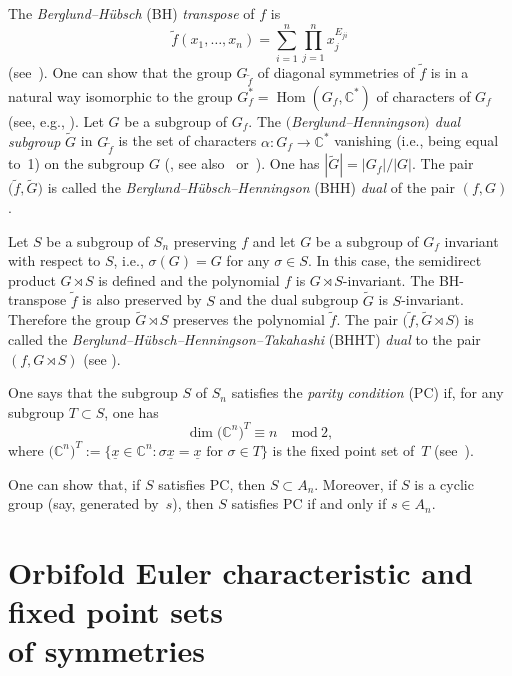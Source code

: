 The {\em Berglund--H\"ubsch} (BH) {\em transpose} of $f$ is
\[
\widetilde{f}(x_1, \dots, x_n)=\sum_{i=1}^n \prod_{j=1}^n x_j^{E_{ji}}
\]
(see~\cite{BH1}). One can show that the group $G_{\widetilde{f}}$ of diagonal symmetries of $\widetilde{f}$ is in a natural way isomorphic
to the group $G_f^*=\operatorname{Hom}(G_f,{\mathbb C}^*)$ of characters of $G_f$ (see, e.g., \cite[Proposition~2]{EG-BLMS}). Let $G$ be a subgroup of $G_f$. The {\em $($Berglund--Henningson$)$ dual subgroup} $\widetilde{G}$ in $G_{\widetilde{f}}$ is the set of characters $\alpha\colon G_f \to {\mathbb C}^*$ vanishing (i.e., being equal to~1) on the subgroup $G$ (\cite{BH2}, see also~\cite{Krawitz-thesis} or~\cite{Krawitz}). One has $|\widetilde{G}|=|G_f|/|G|$. The pair $\big(\widetilde{f},\widetilde{G}\big)$ is called the {\em Berglund--H\"ubsch--Henningson} (BHH) {\em dual}
of the pair $(f,G)$.

Let $S$ be a subgroup of $S_n$ preserving $f$ and let $G$ be a subgroup of $G_f$ invariant with respect to $S$, i.e., $\sigma(G)=G$ for any $\sigma \in S$. In this case, the semidirect product $G \rtimes S$ is defined and the polynomial $f$ is $G \rtimes S$-invariant. The BH-transpose $\widetilde{f}$ is also preserved by $S$ and the dual subgroup $\widetilde{G}$ is $S$-invariant. Therefore the group $\widetilde{G} \rtimes S$ preserves the polynomial $\widetilde{f}$. The pair $\big(\widetilde{f},\widetilde{G}\rtimes S\big)$ is called the {\em Berglund--H\"ubsch--Henningson--Takahashi} (BHHT) {\em dual} to the pair $(f,G\rtimes S)$ (see \cite{EG-IMRN}).

One says that the subgroup $S$ of $S_n$ satisfies the {\em parity condition} (PC) if, for any subgroup
$T \subset S$, one has
\[
\dim\big({\mathbb C}^n\big)^T \equiv n \quad \mbox{mod}\ 2,
\]
where $\big({\mathbb C}^n\big)^T:= \big\{ \underline{x} \in {\mathbb C}^n \colon \sigma \underline{x} =
\underline{x} \mbox{ for } \sigma \in T \big\}$ is the fixed point set of~$T$ (see~\cite{EG-IMRN}).

One can show that, if $S$ satisfies PC, then $S \subset A_n$. Moreover, if $S$ is a cyclic group (say, generated by~$s$), then $S$ satisfies PC if and only if $s \in A_n$.

\section[Orbifold Euler characteristic and fixed point sets of symmetries]{Orbifold Euler characteristic and fixed point sets\\ of symmetries} \label{sect:orbifold}

